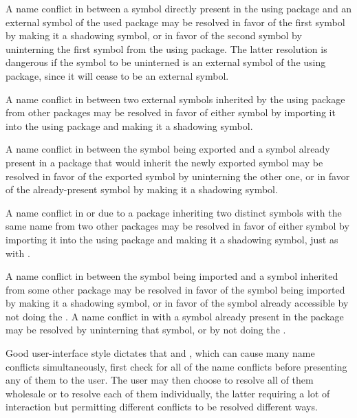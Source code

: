A name conflict in  between a symbol directly present in the
using package and an external symbol of the used package may be resolved
in favor of the first symbol by making it a shadowing symbol, or in favor
of the second symbol by uninterning the first symbol from the using
package.  The latter resolution is dangerous if the symbol to be
uninterned is an external symbol of the using package, since it
will cease to be an external symbol.

A name conflict in  between two external symbols inherited
by the using package from other packages may be resolved in favor of
either symbol by importing it into the using package and making it a
shadowing symbol.

A name conflict in  between the symbol being exported and a
symbol already present in a package that would inherit the
newly exported symbol may be resolved in favor of the exported symbol
by uninterning the other one, or in favor of the already-present
symbol by making it a shadowing symbol.

A name conflict in  or  due to a package
inheriting two distinct symbols with the same name from two other
packages may be resolved in favor of either symbol by importing it into
the using package and making it a shadowing symbol, just as with
.

A name conflict in  between the symbol being imported and a
symbol inherited from some other package may be resolved in favor of the
symbol being imported by making it a shadowing symbol, or in favor
of the symbol already accessible by not doing the .  A
name conflict in  with a symbol already present in the
package may be resolved by uninterning that symbol, or by not
doing the .

Good user-interface style dictates that  and ,
which can cause many name conflicts simultaneously, first check for
all of the name conflicts before presenting any of them to the user.
The user may then choose to resolve all of them wholesale or to resolve
each of them individually, the latter requiring a lot of
interaction but permitting
different conflicts to be resolved different ways.

